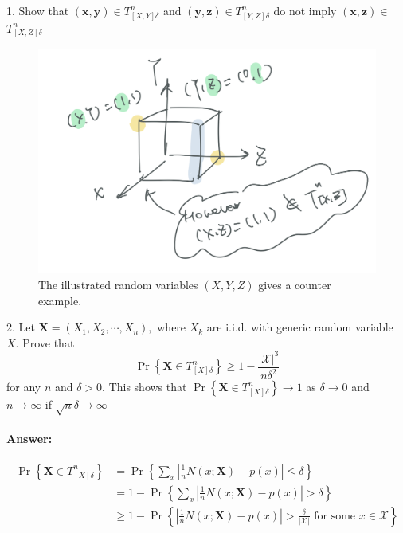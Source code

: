 \documentclass[8pt]{article}
\begin{document}
\newpage
\begin{tcolorbox}
1. Show that $(\mathbf{x}, \mathbf{y}) \in T_{[X, Y] \delta}^{n}$ and $(\mathbf{y}, \mathbf{z}) \in T_{[Y, Z] \delta}^{n}$ do not imply $(\mathbf{x}, \mathbf{z}) \in$
$T_{[X, Z] \delta}^{n}$
\end{tcolorbox}
\begin{figure}[!h]
	\centering
	\includegraphics[width=0.3\linewidth]{imgs/hw6_1.png}
	\caption{The illustrated random variables $(X, Y, Z)$ gives a counter example.}
\end{figure}

\begin{tcolorbox}
2. Let $\mathbf{X}=\left(X_{1}, X_{2}, \cdots, X_{n}\right),$ where $X_{k}$ are i.i.d. with generic random variable $X .$ Prove that
$$
\operatorname{Pr}\left\{\mathbf{X} \in T_{[X] \delta}^{n}\right\} \geq 1-\frac{|\mathcal{X}|^{3}}{n \delta^{2}}
$$
for any $n$ and $\delta>0 .$ This shows that $\operatorname{Pr}\left\{\mathbf{X} \in T_{[X] \delta}^{n}\right\} \rightarrow 1$ as $\delta \rightarrow 0$ and $n \rightarrow \infty$ if $\sqrt{n} \delta \rightarrow \infty$
\end{tcolorbox}
\paragraph{Answer:}
$$
\begin{aligned}
	\operatorname{Pr}\left\{\mathbf{X} \in T_{[X] \delta}^{n}\right\} 
	&=\operatorname{Pr}\left\{\sum_{x}\left|\frac{1}{n} N(x ; \mathbf{X})-p(x)\right| \leq \delta\right\} \\
	&=1-\operatorname{Pr}\left\{\sum_{x}\left|\frac{1}{n} N(x ; \mathbf{X})-p(x)\right|>\delta\right\} \\
	&\geq 1-\operatorname{Pr}\left\{\left|\frac{1}{n} N(x ; \mathbf{X})-p(x)\right|>\frac{\delta}{|\mathcal{X}|} \text { for some } x \in \mathcal{X}\right\} \\
\end{aligned}
$$
\end{document}
